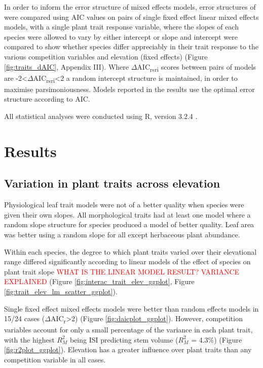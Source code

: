 \documentclass[a4paper,11pt]{article}
\newcommand{\todo}[1]{\textcolor{red}{#1}}   %
\begin{document}
In order to inform the error structure of mixed effects models, error structures of were compared using AIC values on pairs of single fixed effect linear mixed effects models, with a single plant trait response variable, where the slopes of each species were allowed to vary by either intercept or slope and intercept were compared to show whether species differ appreciably in their trait response to the various competition variables and elevation (fixed effects) (Figure \ref{fig:traits_dAIC}, Appendix III). Where $\Delta$AIC\textsubscript{rsri} scores between pairs of models are -2<$\Delta$AIC\textsubscript{rsri}<2 a random intercept structure is maintained, in order to maximise parsimoniousness. Models reported in the results use the optimal error structure according to AIC.



All statistical analyses were conducted using R, version 3.2.4 \citep{R2016}.

\section{Results}

\subsection{Variation in plant traits across elevation}

Physiological leaf trait models were not of a better quality when species were given their own slopes. All morphological traits had at least one model where a random slope structure for species produced a model of better quality. Leaf area was better using a random slope for all except herbaceous plant abundance.

Within each species, the degree to which plant traits varied over their elevational range differed significantly according to linear models of the effect of species on plant trait slope \todo{WHAT IS THE LINEAR MODEL RESULT? VARIANCE EXPLAINED} (Figure \ref{fig:interac_trait_elev_ggplot}, Figure \ref{fig:trait_elev_lm_scatter_ggplot}).

Single fixed effect mixed effects models were better than random effects models in 15/24 cases ($\Delta$AIC\textsubscript{r}>2) (Figure \ref{fig:daicplot_ggplot}).  However, competition variables account for only a small percentage of the variance in each plant trait, with the highest $R_M^2$ being ISI predicting stem volume ($R_M^2$ = 4.3\%) (Figure \ref{fig:r2plot_ggplot}). Elevation has a greater influence over plant traits than any competition variable in all cases.
\end{document}
